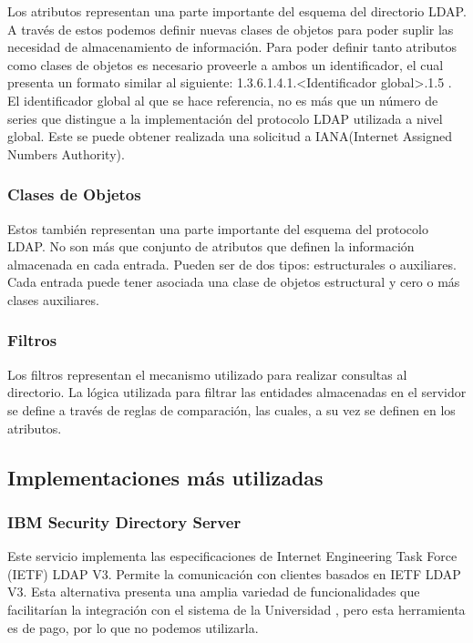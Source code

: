 Los atributos representan una parte importante del esquema del directorio LDAP. A trav\'es de estos podemos definir nuevas clases de objetos para poder suplir las necesidad de almacenamiento de informaci\'on. Para poder definir tanto atributos como clases de objetos es necesario proveerle a ambos un identificador, el cual presenta un formato similar al siguiente: 1.3.6.1.4.1.<Identificador global>.1.5 .
El identificador global al que se hace referencia, no es m\'as que un n\'umero de series que distingue a la implementaci\'on del protocolo LDAP utilizada a nivel global. Este se puede obtener realizada una solicitud a IANA(Internet Assigned Numbers Authority).

\subsubsection{Clases de Objetos}
Estos tambi\'en representan una parte importante del esquema del protocolo LDAP. No son m\'as que conjunto de atributos que definen la informaci\'on almacenada en cada entrada. Pueden ser de dos tipos: estructurales o auxiliares. Cada entrada puede tener asociada una clase de objetos estructural y cero o m\'as clases auxiliares.

\subsubsection{Filtros}
Los filtros representan el mecanismo utilizado para realizar consultas al directorio. La l\'ogica utilizada para filtrar las entidades almacenadas en el servidor se define a trav\'es de reglas de comparaci\'on, las cuales, a su vez se definen en los atributos.

\subsection{Implementaciones m\'as utilizadas}
\subsubsection{IBM Security Directory Server}
Este servicio implementa las especificaciones de Internet Engineering Task Force (IETF) LDAP V3. Permite la comunicaci\'on con clientes basados en IETF LDAP V3.   Esta alternativa presenta una amplia variedad de funcionalidades que facilitar\'ian la integraci\'on con el sistema de la Universidad , pero esta herramienta es de pago, por lo que no podemos utilizarla.
